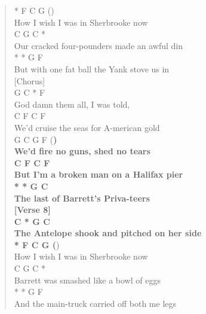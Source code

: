 \documentclass[11pt]{article}
\begin{document}
\begin{verse}
{\hspace*{6em}*      F      C          G     (})\\
How I wish I was in Sherbrooke now\\
\hspace*{4em}C            G                C     *\\
Our cracked four-pounders made an awful din\\
\hspace*{9em}*       *             G        F\\
But with one fat ball the Yank stove us in\\
\vspace*{1em}
[Chorus]\\
\hspace*{4em}G         C    *     F\\
God damn them all, I was told,\\
\hspace*{5em}C          F          C       F\\
We'd cruise the seas for A-merican gold\\
\hspace*{5em}G       C     G       F     (\textbf{)\\
We'd fire no guns, shed no tears\\
\hspace*{10em}C      F        C       F\\
But I'm a broken man on a Halifax pier\\
\hspace*{4em}*       *         G     C\\
The last of Barrett's Priva-teers\\
\vspace*{1em}
[Verse 8]\\
\hspace*{4em}C        *         G              C\\
The Antelope shook and pitched on her side\\
\hspace*{6em}*      F      C          G     (})\\
How I wish I was in Sherbrooke now\\
C           G              C       *\\
Barrett was smashed like a bowl of eggs\\
\hspace*{8em}*          *           G       F\\
And the main-truck carried off both me legs\\

\end{verse}
\end{document}
